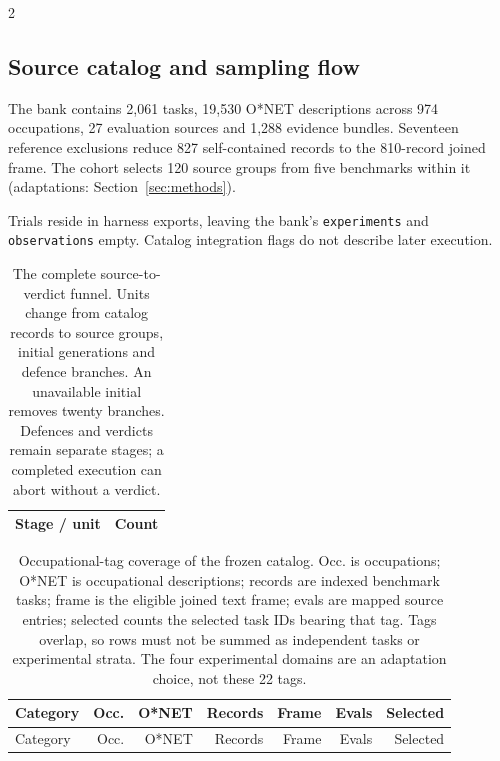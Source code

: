 \begin{multicols}{2}
\subsection{Source catalog and sampling flow}
\label{app:diagnostic-bank}
The bank contains 2,061 tasks, 19,530 O*NET descriptions across 974 occupations,
27 evaluation sources and 1,288 evidence bundles. Seventeen reference
exclusions reduce 827 self-contained records to the 810-record joined frame.
The cohort selects 120 source groups from five benchmarks within it
(adaptations: Section~\ref{sec:methods}).

Trials reside in harness exports, leaving the bank's \texttt{experiments}
and \texttt{observations} empty. Catalog integration flags do not describe
later execution.
\end{multicols}

\begin{table}[H]
\centering\small
\begin{tabular}{lr}
\toprule
Stage / unit & Count\\\midrule

\bottomrule
\end{tabular}
\caption{The complete source-to-verdict funnel. Units change from catalog
records to source groups, initial generations and defence branches. An
unavailable initial removes twenty branches. Defences and verdicts remain
separate stages; a completed execution can abort without a verdict.}
\label{tab:diagnostic-flow}
\end{table}

\begingroup\small\setlength{\tabcolsep}{3pt}
\begin{longtable}{>{\raggedright\arraybackslash}p{.36\linewidth}rrrrrr}
\caption{Occupational-tag coverage of the frozen catalog. Occ. is occupations;
O*NET is occupational descriptions; records are indexed benchmark tasks;
frame is the eligible joined text frame; evals are mapped source entries;
selected counts the selected task IDs bearing that tag. Tags overlap, so
rows must not be summed as independent tasks or experimental strata. The
four experimental domains are an adaptation choice, not these 22 tags.}
\label{tab:diagnostic-categories}\\
\toprule Category & Occ. & O*NET & Records & Frame & Evals & Selected\\\midrule\endfirsthead
\toprule Category & Occ. & O*NET & Records & Frame & Evals & Selected\\\midrule\endhead

\bottomrule
\end{longtable}
\endgroup

